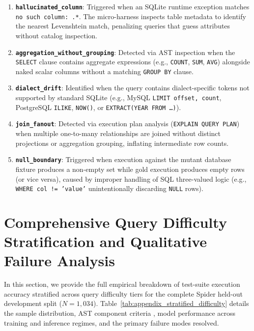 \documentclass{article}
\theoremstyle{plain}
\theoremstyle{definition}
\theoremstyle{remark}
\begin{document}
\begin{enumerate}[leftmargin=*,itemsep=2pt]
    \item \textbf{\texttt{hallucinated\_column}}: Triggered when an SQLite runtime exception matches \texttt{no such column: .*}. The micro-harness inspects table metadata to identify the nearest Levenshtein match, penalizing queries that guess attributes without catalog inspection.
    \item \textbf{\texttt{aggregation\_without\_grouping}}: Detected via AST inspection when the \texttt{SELECT} clause contains aggregate expressions (e.g., \texttt{COUNT}, \texttt{SUM}, \texttt{AVG}) alongside naked scalar columns without a matching \texttt{GROUP BY} clause.
    \item \textbf{\texttt{dialect\_drift}}: Identified when the query contains dialect-specific tokens not supported by standard SQLite (e.g., MySQL \texttt{LIMIT offset, count}, PostgreSQL \texttt{ILIKE}, \texttt{NOW()}, or \texttt{EXTRACT(YEAR FROM \dots)}).
    \item \textbf{\texttt{join\_fanout}}: Detected via execution plan analysis (\texttt{EXPLAIN QUERY PLAN}) when multiple one-to-many relationships are joined without distinct projections or aggregation grouping, inflating intermediate row counts.
    \item \textbf{\texttt{null\_boundary}}: Triggered when execution against the mutant database fixture produces a non-empty set while gold execution produces empty rows (or vice versa), caused by improper handling of SQL three-valued logic (e.g., \texttt{WHERE col != 'value'} unintentionally discarding \texttt{NULL} rows).
\end{enumerate}

\section{Comprehensive Query Difficulty Stratification and Qualitative Failure Analysis}
\label{sec:appendix_difficulty_stratification}

In this section, we provide the full empirical breakdown of test-suite execution accuracy stratified across query difficulty tiers for the complete Spider held-out development split ($N=1{,}034$). Table~\ref{tab:appendix_stratified_difficulty} details the sample distribution, AST component criteria \citep{yu2018spider}, model performance across training and inference regimes, and the primary failure modes resolved.
\end{document}
